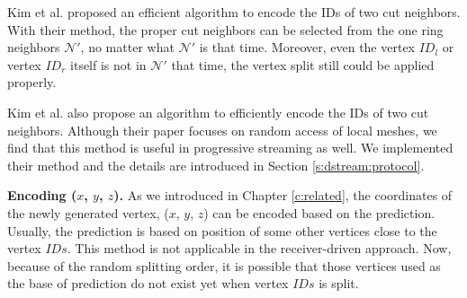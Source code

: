     Kim et al. \cite{multiresolution:kim} proposed an efficient algorithm to encode the IDs
    of two cut neighbors. With their method, the proper cut neighbors can be selected from
    the one ring neighbors $\mathcal{N}'$, no matter what $\mathcal{N}'$ is that time. 
    Moreover, even the vertex $ID_l$ or vertex $ID_r$ itself is not in $\mathcal{N'}$ that
    time, the vertex split still could be applied properly.

    Kim et al. \cite{multiresolution:kim} also propose an algorithm
    to efficiently encode the IDs of two cut neighbors.
    Although their paper focuses on random access of local meshes, we find that this 
	method is useful in progressive streaming as well. We implemented their method and
    the details are introduced in Section \ref{s:dstream:protocol}.
    
    \textbf{Encoding ($x$, $y$, $z$).}
    As we introduced in Chapter \ref{c:related}, the coordinates of the newly generated
    vertex, ($x$, $y$, $z$) can be encoded based on the prediction. Usually, the prediction
    is based on position of some other vertices close to the vertex $IDs$. This method is 
    not applicable in the receiver-driven approach. Now, because of the random splitting order, 
    it is possible that those vertices used as the base of prediction 
    do not exist yet when vertex $IDs$ is split. 
    
